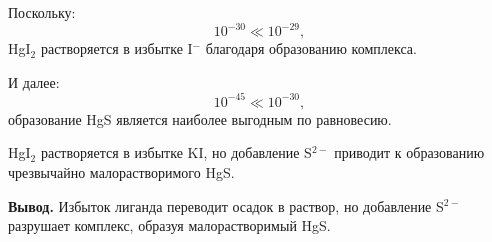 \documentclass[a4paper,12pt]{article}
\begin{document}
	Поскольку:
	\[
	10^{-30} \ll 10^{-29},
	\]
	HgI$_2$ растворяется в избытке I$^-$ благодаря образованию комплекса.
	
	И далее:
	\[
	10^{-45} \ll 10^{-30},
	\]
	образование HgS является наиболее выгодным по равновесию.
	
	\quad HgI$_2$ растворяется в избытке KI, но добавление S$^{2-}$ приводит к образованию чрезвычайно малорастворимого HgS.
	
	\textbf{Вывод.}  
	Избыток лиганда переводит осадок в раствор, но добавление S$^{2-}$ разрушает комплекс, образуя малорастворимый HgS.
	
\end{document}

